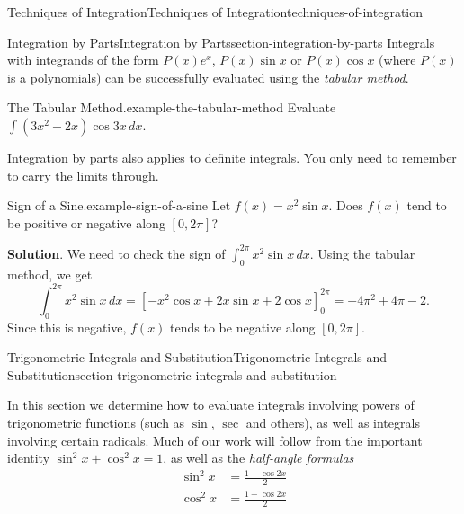\documentclass[oneside,10pt,]{book}
\numberwithin{equation}{section}
\begin{document}
\begin{chapterptx}{Techniques of Integration}{}{Techniques of Integration}{}{}{techniques-of-integration}
\begin{sectionptx}{Integration by Parts}{}{Integration by Parts}{}{}{section-integration-by-parts}
\hypertarget{p-514}{}%
Integrals with integrands of the form \(P(x)e^{x}\), \(P(x)\sin x\) or \(P(x)\cos x\) (where \(P(x)\) is a polynomials) can be successfully evaluated using the \emph{tabular method}.%
\begin{example}{The Tabular Method.}{example-the-tabular-method}%
\hypertarget{p-515}{}%
Evaluate \(\int (3x^{2} - 2x)\cos3x\,dx\).%
\end{example}
\hypertarget{p-516}{}%
Integration by parts also applies to definite integrals. You only need to remember to carry the limits through.%
\begin{example}{Sign of a Sine.}{example-sign-of-a-sine}%
\hypertarget{p-517}{}%
Let \(f(x) = x^{2}\sin x\). Does \(f(x)\) tend to be positive or negative along \([0,2\pi]\)?%
\par\smallskip%
\noindent\textbf{Solution}.\hypertarget{solution-113}{}\quad%
\hypertarget{p-518}{}%
We need to check the sign of \(\int_{0}^{2\pi}x^{2}\sin x\,dx\). Using the tabular method, we get%
\begin{equation*}
\int_{0}^{2\pi}x^{2}\sin x\,dx = [-x^{2}\cos x + 2x\sin x + 2\cos x]_{0}^{2\pi} = -4\pi^{2} + 4\pi - 2.
\end{equation*}
Since this is negative, \(f(x)\) tends to be negative along \([0,2\pi]\).%
\end{example}
\end{sectionptx}
%
%
\typeout{************************************************}
\typeout{************************************************}
%
\begin{sectionptx}{Trigonometric Integrals and Substitution}{}{Trigonometric Integrals and Substitution}{}{}{section-trigonometric-integrals-and-substitution}
\begin{introduction}{}%
\hypertarget{p-519}{}%
In this section we determine how to evaluate integrals involving powers of trigonometric functions (such as \(\sin\), \(\sec\) and others), as well as integrals involving certain radicals. Much of our work will follow from the important identity \(\sin^{2}x + \cos^{2}x = 1\), as well as the \emph{half-angle formulas}%
\begin{align*}
\sin^{2}x & = \frac{1 - \cos2x}{2} \\
\cos^{2}x & = \frac{1 + \cos2x}{2} 
\end{align*}
%
\end{introduction}%
%
%
\typeout{************************************************}

\end{sectionptx}
\end{chapterptx}
\end{document}
